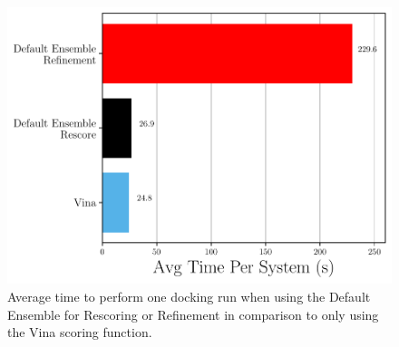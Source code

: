 \documentclass[journal=jcisd8,manuscript=article]{achemso}
\begin{document}
\begin{figure}
    \centering
    \includegraphics{figures/other/refine_timing_comparison.pdf}
    \caption{Average time to perform one docking run when using the Default Ensemble for Rescoring or Refinement in comparison to only using the Vina scoring function.}
    \label{fig:RefineTiming}
\end{figure}
\end{document}
